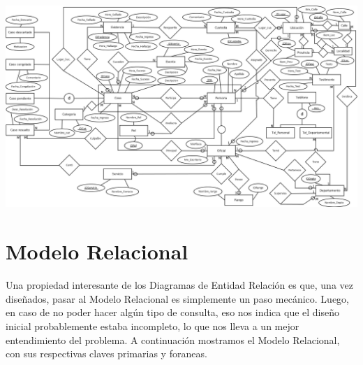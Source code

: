 \documentclass{article}
\theoremstyle{definition}
\theoremstyle{remark}
\begin{document}
\includegraphics[width=\textheight,height=\textwidth*11/10,angle=90]{der.png}

\section{Modelo Relacional}

Una propiedad interesante de los Diagramas de Entidad Relación es que, una vez diseñados, pasar al Modelo Relacional es simplemente un paso mecánico. Luego, en caso de no poder hacer algún tipo de consulta, eso nos indica que el diseño inicial probablemente estaba incompleto, lo que nos lleva a un mejor entendimiento del problema. A continuación mostramos el Modelo Relacional, con sus respectivas claves primarias y foraneas.
\end{document}
